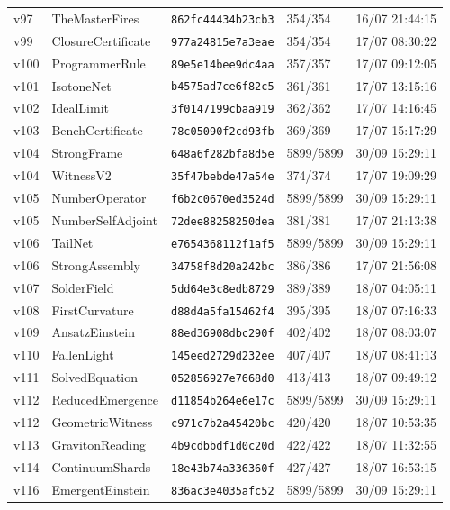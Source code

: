\documentclass[11pt]{article}
\theoremstyle{definition}\newtheorem{deriv}{Derivação}
\begin{document}
{\begin{longtable}{@{}lllll@{}}
v97 & TheMasterFires & \texttt{862fc44434b23cb3} & 354/354 & 16/07 21:44:15 \\
v99 & ClosureCertificate & \texttt{977a24815e7a3eae} & 354/354 & 17/07 08:30:22 \\
v100 & ProgrammerRule & \texttt{89e5e14bee9dc4aa} & 357/357 & 17/07 09:12:05 \\
v101 & IsotoneNet & \texttt{b4575ad7ce6f82c5} & 361/361 & 17/07 13:15:16 \\
v102 & IdealLimit & \texttt{3f0147199cbaa919} & 362/362 & 17/07 14:16:45 \\
v103 & BenchCertificate & \texttt{78c05090f2cd93fb} & 369/369 & 17/07 15:17:29 \\
v104 & StrongFrame & \texttt{648a6f282bfa8d5e} & 5899/5899 & 30/09 15:29:11 \\
v104 & WitnessV2 & \texttt{35f47bebde47a54e} & 374/374 & 17/07 19:09:29 \\
v105 & NumberOperator & \texttt{f6b2c0670ed3524d} & 5899/5899 & 30/09 15:29:11 \\
v105 & NumberSelfAdjoint & \texttt{72dee88258250dea} & 381/381 & 17/07 21:13:38 \\
v106 & TailNet & \texttt{e7654368112f1af5} & 5899/5899 & 30/09 15:29:11 \\
v106 & StrongAssembly & \texttt{34758f8d20a242bc} & 386/386 & 17/07 21:56:08 \\
v107 & SolderField & \texttt{5dd64e3c8edb8729} & 389/389 & 18/07 04:05:11 \\
v108 & FirstCurvature & \texttt{d88d4a5fa15462f4} & 395/395 & 18/07 07:16:33 \\
v109 & AnsatzEinstein & \texttt{88ed36908dbc290f} & 402/402 & 18/07 08:03:07 \\
v110 & FallenLight & \texttt{145eed2729d232ee} & 407/407 & 18/07 08:41:13 \\
v111 & SolvedEquation & \texttt{052856927e7668d0} & 413/413 & 18/07 09:49:12 \\
v112 & ReducedEmergence & \texttt{d11854b264e6e17c} & 5899/5899 & 30/09 15:29:11 \\
v112 & GeometricWitness & \texttt{c971c7b2a45420bc} & 420/420 & 18/07 10:53:35 \\
v113 & GravitonReading & \texttt{4b9cdbbdf1d0c20d} & 422/422 & 18/07 11:32:55 \\
v114 & ContinuumShards & \texttt{18e43b74a336360f} & 427/427 & 18/07 16:53:15 \\
v116 & EmergentEinstein & \texttt{836ac3e4035afc52} & 5899/5899 & 30/09 15:29:11 \\

\end{longtable}}
\end{document}

